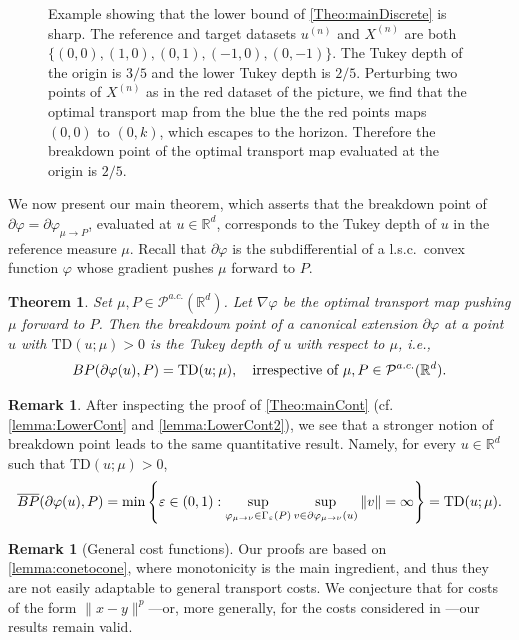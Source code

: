 \documentclass[11pt]{article}
\newcommand{\R}{\mathbb{R}}
\newcommand{\eps}{\varepsilon}
\theoremstyle{plain}
\newtheorem{theorem}[sectioncount]{Theorem}
\theoremstyle{definition}
\newtheorem{remark}[sectioncount]{Remark}
\begin{document}
\begin{figure}[h!]
{}
    \caption{Example showing that the lower bound of \autoref{Theo:mainDiscrete} is sharp. The reference and target datasets $u^{(n)}$ and $X^{(n)}$ are both $\{(0,0), (1,0), (0,1), (-1, 0), (0,-1)\}$. The Tukey depth of the origin is $ 3/5$ and the lower Tukey  depth is $2/5$. Perturbing two points of $X^{(n)}$  as in the red dataset of the picture, we find that the optimal transport map from the blue the the  red points maps $(0,0)$ to $(0,k)$, which escapes to the horizon. Therefore the breakdown point of the optimal transport map evaluated at the origin is $2/5$.}
    \label{fig:Sharp}
\end{figure}



We now present our main theorem, which asserts that the breakdown point of $\partial \varphi = \partial \varphi_{\mu \to P}$, evaluated at $u \in \mathbb{R}^d$, corresponds to the Tukey depth of $u$ in the reference measure $\mu$. 
%
Recall that $\partial \varphi$ is the subdifferential of a l.s.c.\ convex function $\varphi$ whose gradient pushes $\mu$ forward to $P$. 
%
\begin{theorem}    \label{Theo:mainCont}
    Set $\mu,P\in \mathcal{P}^{a.c.}(\R^d)$. Let $\nabla \varphi $ be the optimal transport map  pushing $\mu$ forward to $P$.   Then the breakdown point of a canonical extension $\partial \varphi$ at a point $u$ with $\mathrm{TD}(u; \mu)>0$  is the Tukey depth of  $u$  with respect to  $\mu$, i.e.,   
    $${\rm BP}(\partial \varphi(u), P)=\mathrm{TD}(u; \mu), \quad \text{irrespective of $\mu,P \in \mathcal{P}^{a.c.}(\R^d)$.}
$$
\end{theorem}

\begin{remark}\label{rem:anotherBP}After inspecting the proof of \autoref{Theo:mainCont} (cf. \autoref{lemma:LowerCont} and \autoref{lemma:LowerCont2}), we see that a stronger notion of breakdown point leads to the same quantitative result. Namely, for every $u\in \R^d$ such that $\mathrm{TD}(u; \mu)>0$, 
    $$\overline{\rm BP}(\partial \varphi(u), P)= \min \left\{ \eps\in (0,1): \sup_{\varphi_{\mu\to \nu}\in \Gamma_\eps(P)} \sup_{v\in \partial \varphi_{\mu\to \nu} (u)} \|v\| = \infty\right \}=\mathrm{TD}(u; \mu).$$
 \end{remark}
 {
\begin{remark}[General cost functions]
Our proofs are based on \autoref{lemma:conetocone}, where monotonicity is the main ingredient, and thus they are not easily adaptable to general transport costs. We conjecture that for costs of the form $\|x-y\|^p$—or, more generally, for the costs considered in \cite{GangboMcCann.96}—our results remain valid.
\end{remark}
}
\end{document}
